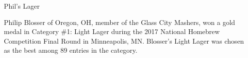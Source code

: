 \begin{recipie}{Phil's Lager}

\begin{aboutblock}
Philip Blosser of Oregon, OH, member of the Glass City Mashers, won a gold medal in
Category \#1: Light Lager during the 2017 National Homebrew Competition Final Round in
Minneapolis, MN. Blosser’s Light Lager was chosen as the best among 89 entries in the
category.
\end{aboutblock}


\begin{methodandtiming}
  
\begin{mashsteps}
\end{mashsteps}

\begin{fermentationsteps}
\end{fermentationsteps}

\end{methodandtiming}

\pagebreak

\begin{ingredientsblock}

\begin{malts}
\end{malts}

\begin{hops}
\end{hops}

\begin{yeasts}
\end{yeasts}

\end{ingredientsblock}

\end{recipie}